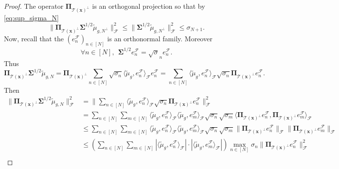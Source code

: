 \documentclass[twoside,11pt]{book}
\numberwithin{theorem}{chapter}
\numberwithin{definition}{chapter}
\numberwithin{proposition}{chapter}
\numberwithin{corollary}{chapter}
\numberwithin{example}{chapter}
\numberwithin{lemma}{chapter}
\numberwithin{assumption}{chapter}
\numberwithin{equation}{chapter}
\numberwithin{figure}{chapter}
\DeclareMathOperator{\F}{\mathcal{F}}
\begin{document}
\begin{proof}
The operator $\bm{\Pi}_{\mathcal{T}(\bm{x})^{\perp}}$ is an orthogonal projection so that by \eqref{eq:sup_sigma_N}
%
\begin{equation}
\| \bm{\Pi}_{\mathcal{T}(\bm{x})^{\perp}}\bm{\Sigma}^{1/2} \tilde{\mu}_{g,N^{\perp}}\| _{\mathcal{F}}^{2} \leq \| \bm{\Sigma}^{1/2} \tilde{\mu}_{g,N^{\perp}}\| _{\mathcal{F}}^{2} \leq \sigma_{N+1}.
\end{equation}
Now, recall that the $(e_{n}^{\mathcal{F}})_{n \in [N]}$ is an orthonormal family. Moreover
\begin{equation}
\forall n \in [N], \:\: \bm{\Sigma}^{1/2}e_{n}^{\F} = \sqrt{\sigma}_{n} e_{n}^{\F}.
\end{equation}
 Thus
 \begin{equation}
\bm{\Pi}_{\mathcal{T}(\bm{x})^{\perp}}\bm{\Sigma}^{1/2}\tilde{\mu}_{g,N} = \bm{\Pi}_{\mathcal{T}(\bm{x})^{\perp}}\sum\limits_{n \in [N]} \sqrt{\sigma_{n}} \langle \tilde{\mu}_{g}, e_{n}^{\mathcal{F}} \rangle_{\mathcal{F}} e_{n}^{\mathcal{F}} = \sum\limits_{n \in [N]} \langle \tilde{\mu}_{g}, e_{n}^{\mathcal{F}} \rangle_{\mathcal{F}} \sqrt{\sigma_{n}} \bm{\Pi}_{\mathcal{T}(\bm{x})^{\perp}}e_{n}^{\mathcal{F}}.
\end{equation}
Then
\begin{align}
    \|\bm{\Pi}_{\mathcal{T}(\bm{x})^{\perp}}\bm{\Sigma}^{1/2} \tilde{\mu}_{g,N}\|_{\mathcal{F}}^{2} & = \| \sum\limits_{n \in [N]} \langle \tilde{\mu}_{g}, e_{n}^{\mathcal{F}} \rangle_{\mathcal{F}} \sqrt{\sigma_{n}} \bm{\Pi}_{\mathcal{T}(\bm{x})^{\perp}}e_{n}^{\mathcal{F}} \|_{\mathcal{F}}^{2}\\
    & = \sum\limits_{n \in [N]} \sum\limits_{m \in [N]}\langle \tilde{\mu}_{g}, e_{n}^{\mathcal{F}} \rangle_{\mathcal{F}} \langle \tilde{\mu}_{g}, e_{m}^{\mathcal{F}} \rangle_{\mathcal{F}} \sqrt{\sigma_{n}}\sqrt{\sigma_{m}}  \langle  \bm{\Pi}_{\mathcal{T}(\bm{x})^{\perp}}e_{n}^{\mathcal{F}}, \bm{\Pi}_{\mathcal{T}(\bm{x})^{\perp}}e_{m}^{\mathcal{F}}\rangle_{\mathcal{F}} \nonumber\\
    & \leq \sum\limits_{n \in [N]} \sum\limits_{m \in [N]}\langle \tilde{\mu}_{g}, e_{n}^{\mathcal{F}} \rangle_{\mathcal{F}} \langle \tilde{\mu}_{g}, e_{m}^{\mathcal{F}} \rangle_{\mathcal{F}} \sqrt{\sigma_{n}}\sqrt{\sigma_{m}}   \|\bm{\Pi}_{\mathcal{T}(\bm{x})^{\perp}}e_{n}^{\mathcal{F}}\|_{\mathcal{F}}\|\bm{\Pi}_{\mathcal{T}(\bm{x})^{\perp}}e_{m}^{\mathcal{F}}\|_{\mathcal{F}} \nonumber\\
    & \leq \left( \sum\limits_{n \in [N]} \sum\limits_{m \in [N]} |\langle \tilde{\mu}_{g}, e_{n}^{\mathcal{F}} \rangle_{\mathcal{F}}|\cdot | \langle \tilde{\mu}_{g}, e_{m}^{\mathcal{F}} \rangle_{\mathcal{F}}| \right) \max\limits_{n \in [N]}\sigma_{n}  \|\bm{\Pi}_{\mathcal{T}(\bm{x})^{\perp}}e_{n}^{\mathcal{F}}\|_{\mathcal{F}}^{2} \nonumber\\

\end{align}
\end{proof}
\end{document}
